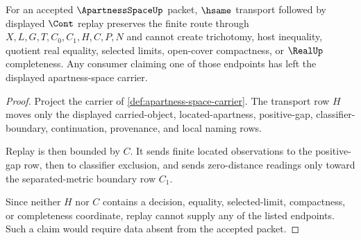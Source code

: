 \begin{theorem}
\label{thm:apartnessspace-transport-and-replay}
For an accepted $\ApartnessSpaceUp$ packet, $\hsame$ transport followed by
displayed $\Cont$ replay preserves the finite route through
$X,L,G,T,C_0,C_1,H,C,P,N$ and cannot create trichotomy, host inequality,
quotient real equality, selected limits, open-cover compactness, or
$\RealUp$ completeness. Any consumer claiming one of those endpoints has left
the displayed apartness-space carrier.
\end{theorem}
\begin{proof}
Project the carrier of \autoref{def:apartness-space-carrier}. The transport
row $H$ moves only the displayed carried-object, located-apartness,
positive-gap, classifier-boundary, continuation, provenance, and local naming
rows.

Replay is then bounded by $C$. It sends finite located observations to the
positive-gap row, then to classifier exclusion, and sends zero-distance
readings only toward the separated-metric boundary row $C_1$.

Since neither $H$ nor $C$ contains a decision, equality, selected-limit,
compactness, or completeness coordinate, replay cannot supply any of the
listed endpoints. Such a claim would require data absent from the accepted
packet.
\end{proof}


